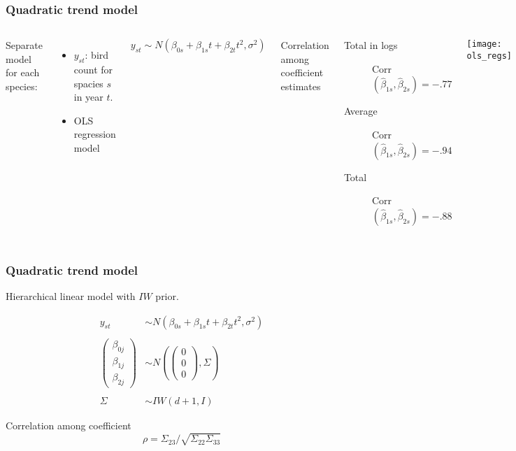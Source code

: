 \documentclass[9pt]{beamer}\usepackage[]{graphicx}\usepackage[]{color}
\begin{document}
\begin{frame}
\frametitle{Quadratic trend model}
  \begin{columns}[T] %
Separate model for each species:
\begin{itemize}
  \item $y_{st}$: bird count for spacies $s$ in year $t$.
  \item OLS regression model 
\end{itemize}

\[
y_{st}  \sim  N(\beta_{0s} + \beta_{1s} t + \beta_{2t}t^2, \sigma^2)
\]

\vspace{.5cm}
Correlation among coefficient estimates
\begin{description}
  \item[Total in logs] Corr$(\hat\beta_{1s}, \hat\beta_{2s}) = -.77$
  \item[Average] Corr$(\hat\beta_{1s}, \hat\beta_{2s}) = -.94$
  \item[Total] Corr$(\hat\beta_{1s}, \hat\beta_{2s}) = -.88$
\end{description}

    \texttt{[image: ols\_regs]}
  \end{columns}

\end{frame}

\begin{frame}
\frametitle{Quadratic trend model}

Hierarchical linear model with $IW$ prior. 

\[\begin{array}{cl}
y_{st}  & \sim  N(\beta_{0s} + \beta_{1s} t + \beta_{2t}t^2, \sigma^2) \\
& \\
\begin{pmatrix} \beta_{0j} \\ \beta_{1j} \\ \beta_{2j} \end{pmatrix} & \sim  N \left( \begin{pmatrix} 0 \\ 0 \\ 0 \end{pmatrix} , \Sigma \right) \\
& \\
\Sigma & \sim  IW(d+1, I)
\end{array}
\]

Correlation among coefficient
\[ \rho = \Sigma_{23}/\sqrt{\Sigma_{22}\Sigma_{33}} \]

\end{frame}
\end{document}
